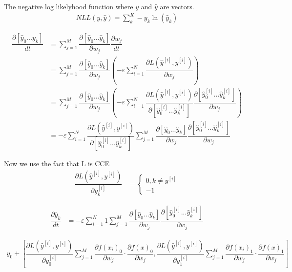The negative log likelyhood function where $y$ and $\hat y$ are vectors.
\begin{align}
    NLL(y, \hat y) = \sum_k^{K} -y_k \ln(\hat y_k)
\end{align}

\begin{align}
    \dfrac{\partial \left[ \hat y_0 ... y_k \right]}{dt} &= \sum_{j=1}^M \dfrac{\partial \left[\hat y_0 ... \hat y_k \right]}{\partial w_j} \dfrac{\partial w_j}{dt}\\
    &= \sum_{j=1}^M \dfrac{\partial \left[\hat y_0 ... \hat y_k \right]}{\partial w_j} \left( -\varepsilon \sum_{i = 1}^N \dfrac{\partial L(\hat y^{[i]}, y^{[i]})}{\partial w_j} \right)\\
    &= \sum_{j=1}^M \dfrac{\partial \left[\hat y_0 ... \hat y_k \right]}{\partial w_j} \left( -\varepsilon \sum_{i = 1}^N \dfrac{\partial L(\hat y^{[i]}, y^{[i]})}{\partial \left[ \hat y^{[i]}_{0} ... \hat y^{[i]}_{k} \right]} \dfrac{\partial \left[ \hat y^{[i]}_{0} ... \hat y^{[i]}_{k} \right]}{\partial w_j} \right)\\
    &=  -\varepsilon \sum_{i = 1}^N \dfrac{\partial L(\hat y^{[i]}, y^{[i]})}{\partial \left[ \hat y^{[i]}_{0} ... \hat y^{[i]}_{k} \right]} \sum_{j=1}^M  \dfrac{\partial \left[\hat y_0 ... \hat y_k \right]}{\partial w_j} \dfrac{\partial \left[ \hat y^{[i]}_{0} ... \hat y^{[i]}_{k} \right]}{\partial w_j} 
\end{align}

Now we use the fact that L is CCE
\begin{align}
    \dfrac{\partial L(\hat y^{[i]}, y^{[i]})}{\partial y^{[i]}_k} &= \begin{cases} 0, k \not = y^{[i]}\\ -1 \end{cases}
\end{align}

\begin{align}
    \dfrac{\partial \hat y_k}{dt} &=  -\varepsilon \sum_{i = 1}^N 1 \sum_{j=1}^M  \dfrac{\partial \left[\hat y_0 ... \hat y_k \right]}{\partial w_j} \dfrac{\partial \left[ \hat y^{[i]}_{0} ... \hat y^{[i]}_{k} \right]}{\partial w_j} 
\end{align}

\begin{align}
    y_0 +  \left[ \dfrac{\partial L(\hat y^{[i]}, y^{[i]})}{\partial y^{[i]}_0} \sum_{j=1}^M \dfrac{\partial f(x_i)_0}{\partial w_j} \cdot\dfrac{\partial f(x)_0}{\partial w_j}, \dfrac{\partial L(\hat y^{[i]}, y^{[i]})}{\partial y^{[i]}_1} \sum_{j=1}^M \dfrac{\partial f(x_i)_1}{\partial w_j} \cdot\dfrac{\partial f(x)_1}{\partial w_j} \right]
\end{align}

